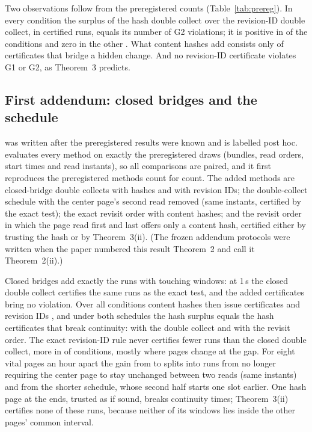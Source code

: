 Two observations follow from the preregistered counts
(Table~\ref{tab:prereg}). In every condition the surplus of the hash double collect over the
revision-ID double collect, in certified runs, equals its number of G2
violations; it is positive in \sPreregMore{} of the \sPreregConditions{}
conditions and zero in the other \sPreregEqual{}. What content hashes add
consists only of certificates that bridge a hidden change. And no
revision-ID certificate violates G1 or G2, as Theorem~3 predicts.

\subsection{First addendum: closed bridges and the schedule}
 was written after the preregistered results were
known and is labelled post hoc.  evaluates every method on
exactly the preregistered draws (bundles, read orders, start times and read
instants), so all comparisons are paired, and it first reproduces the
preregistered methods count for count. The added methods are closed-bridge
double collects with hashes and with revision IDs; the double-collect schedule
with the center page's second read removed (same instants, certified by the
exact test); the exact revisit order with content hashes; and the revisit
order in which the page read first and last offers only a content hash,
certified either by trusting the hash or by Theorem~3(ii). (The frozen addendum
protocols were written when the paper numbered this result Theorem~2 and call
it Theorem~2(ii).)

\begin{table}[t]
\caption{Certified runs per stratum and request gap (of 12{,}000), first addendum. Revision-ID double collect $\to$ center read once $\to$ revisit order is the schedule ablation behind the $+29$ and $+122$ of Figure~2b.}
\label{tab:addendum}
\small

\end{table}

Closed bridges add exactly the runs with touching windows: at 1\,s the closed
double collect certifies the same runs as the exact test, and the added
certificates bring no violation. Over all conditions content hashes then
issue \closedHashCertificates{} certificates and revision IDs
\closedIdCertificates{}, and under both schedules the hash surplus equals the
hash certificates that break continuity: \closedHashFalseGTwo{} with the double
collect and \sHashExactContinuity{} with the revisit order. The exact
revision-ID rule never certifies fewer runs than the closed double collect,
more in \exactMoreConditions{} of \nConditions{} conditions, mostly where pages
change at the gap. For eight vital pages an hour apart the gain from
\vitalEightIdBridge{} to \vitalEightExact{} splits into
\vitalEightCenterGain{} runs from no longer requiring the center page to stay
unchanged between two reads (same instants) and \vitalEightShorterGain{} from
the shorter schedule, whose second half starts one slot earlier. One hash page
at the ends, trusted as if sound, breaks continuity \sTrustedContinuity{}
times; Theorem~3(ii) certifies none of these runs, because neither of its
windows lies inside the other pages' common interval.


